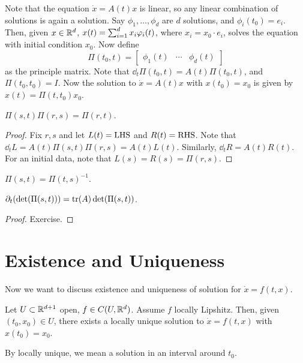 \documentclass[a4paper]{article}
\begin{document}
Note that the equation $\dot{x} = A(t) x$ is linear, so any linear
combination of solutions is again a solution. Say $\phi_1, \dots, \phi_d$
are $d$ solutions, and $\phi_i (t_0) = e_i$. Then, given $x \in \mathbb{R}^d$,
$x(t) = \sum_{i=1}^d x_i \varphi_i (t)$, where $x_i = x_0 \cdot e_i$, solves the
equation with initial condition $x_0$. Now define
\[
  \Pi (t_0, t) = \begin{bmatrix}
    \phi_1 (t) & \cdots & \phi_d (t)
  \end{bmatrix}
\]
as the principle matrix. Note that $\dd_t \Pi (t_0, t) = A(t) \Pi (t_0,
  t)$, and $\Pi (t_0, t_0) = I$. Now the solution to $\dot{x} = A(t) x$
  with $x(t_0) = x_0$ is given by $x(t) = \Pi(t, t_0) x_0$.

\begin{prop}
  $\Pi (s, t) \Pi (r, s) = \Pi (r, t)$.
\end{prop}
\begin{proof}
  Fix $r, s$ and let $L(t) = \operatorname{LHS}$ and $R(t) = \operatorname{RHS}$. Note
  that $\dd_t L = A(t) \Pi(s, t) \Pi(r, s) = A(t) L(t)$. Similarly, $\dd_t
    R = A(t) R(t)$. For an initial data, note that $L(s) = R(s) = \Pi (r,
    s)$.
\end{proof}

\begin{cor}
  $\Pi(s, t) = \Pi(t, s)^{-1}$.
\end{cor}

\begin{prop}
  $\partial_t (\det (\Pi (s, t))) = \operatorname{tr}(A) \det(\Pi (s, t))$.
\end{prop}

\begin{proof}
  Exercise.
\end{proof}

\section{Existence and Uniqueness}

Now we want to discuss existence and uniqueness of solution for $\dot{x} =
f(t, x)$.
\begin{thm}
  Let $U \subset \mathbb{R}^{d + 1}$ open, $f \in C(U, \mathbb{R}^d)$. Assume $f$
  locally Lipshitz. Then, given $(t_0, x_0) \in U$, there exists a locally
  unique solution to $\dot{x} = f(t, x)$ with $x(t_0) = x_0$.
\end{thm}
By locally unique, we mean a solution in an interval around $t_0$.
\end{document}
